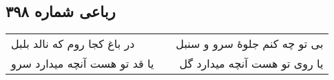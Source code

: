\begin{center}
\section*{رباعی شماره ۳۹۸}
\label{sec:sh398}
\begin{longtable}{l p{0.5cm} r}
در باغ کجا روم که نالد بلبل
&&
بی تو چه کنم جلوهٔ سرو و سنبل
\\
یا قد تو هست آنچه میدارد سرو
&&
یا روی تو هست آنچه میدارد گل
\\
\end{longtable}
\end{center}
